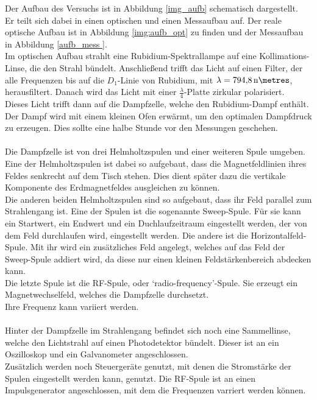Der Aufbau des Versuchs ist in Abbildung \ref{img_aufb} schematisch dargestellt.\\
Er teilt sich dabei in einen optischen und einen Messaufbau auf. Der reale optische Aufbau ist in Abbildung
\ref{img:aufb_opt} zu finden und der Messaufbau in Abbildung \ref{aufb_mess }.\\
Im optischen Aufbau strahlt eine Rubidium-Spektrallampe auf eine Kollimations-Linse, die den Strahl bündelt.
Anschließend trifft das Licht auf einen Filter, der alle Frequenzen bis auf die $D_1$-Linie von Rubidium, 
mit $\lambda = \SI{794.8}{\nano\metres}$, herausfiltert. Danach wird das Licht mit einer $\frac{\lambda}{4}$-Platte zirkular polarisiert.\\
Dieses Licht trifft dann auf die Dampfzelle, welche den Rubidium-Dampf enthält. 
Der Dampf wird mit einem kleinen Ofen erwärmt, um den optimalen Dampfdruck zu erzeugen.
Dies sollte eine halbe Stunde vor den Messungen geschehen.\\\\
Die Dampfzelle ist von drei Helmholtzspulen und einer weiteren Spule umgeben.\\
Eine der Helmholtzspulen ist dabei so aufgebaut, dass die Magnetfeldlinien ihres Feldes senkrecht auf dem Tisch stehen.
Dies dient später dazu die vertikale Komponente des Erdmagnetfeldes ausgleichen zu können.\\
Die anderen beiden Helmholtzspulen sind so aufgebaut, dass ihr Feld parallel zum Strahlengang ist.
Eine der Spulen ist die sogenannte Sweep-Spule. 
Für sie kann ein Startwert, ein Endwert und ein Duchlaufzeitraum eingestellt werden, der von dem Feld durchlaufen wird, eingestellt werden.
Die andere ist die Horizontalfeld-Spule. 
Mit ihr wird ein zusätzliches Feld angelegt, welches auf das Feld der Sweep-Spule addiert wird, da diese nur einen kleinen Feldstärkenbereich abdecken kann.\\
Die letzte Spule ist die RF-Spule, oder \enquote*{radio-frequency}-Spule. 
Sie erzeugt ein Magnetwechselfeld, welches die Dampfzelle durchsetzt.\\
Ihre Frequenz kann variiert werden.\\\\ 
Hinter der Dampfzelle im Strahlengang befindet sich noch eine Sammellinse, welche den Lichtstrahl auf einen Photodetektor bündelt.
Dieser ist an ein Oszilloskop und ein Galvanometer angeschlossen.\\
Zusätzlich werden noch Steuergeräte genutzt, mit denen die Stromstärke der Spulen eingestellt werden kann, genutzt.
Die RF-Spule ist an einen Impulsgenerator angeschlossen, mit dem die Frequenzen varriert werden können.\\


